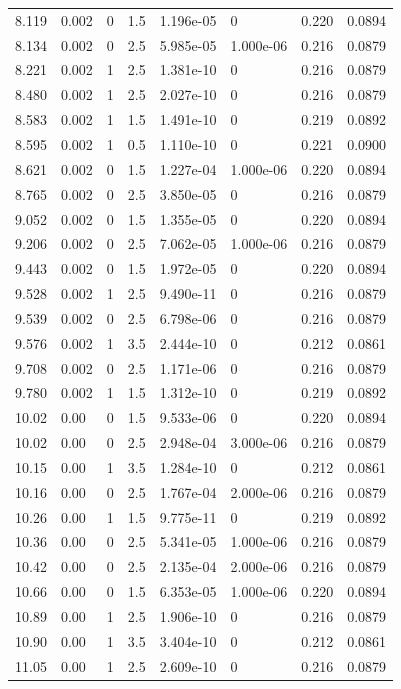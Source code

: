 \documentclass[preview]{standalone}
\begin{document}
{{{\begin{tabular}{L{1.2cm}C{1.2cm} C{0.3cm}C{0.5cm} C{1.4cm}C{1.4cm} C{1.4cm}C{1.4cm}}
  8.119  &  0.002  & 0     & 1.5 &  1.196e-05  & 0  & 0.220 &  0.0894   \\ 
  8.134  &  0.002  & 0     & 2.5 &  5.985e-05  & 1.000e-06  & 0.216 &  0.0879   \\ 
  8.221  &  0.002  & 1     & 2.5 &  1.381e-10  & 0  & 0.216 &  0.0879   \\ 
  8.480  &  0.002  & 1     & 2.5 &  2.027e-10  & 0  & 0.216 &  0.0879   \\ 
  8.583  &  0.002  & 1     & 1.5 &  1.491e-10  & 0  & 0.219 &  0.0892   \\ 
  8.595  &  0.002  & 1     & 0.5 &  1.110e-10  & 0  & 0.221 &  0.0900   \\ 
  8.621  &  0.002  & 0     & 1.5 &  1.227e-04  & 1.000e-06  & 0.220 &  0.0894   \\ 
  8.765  &  0.002  & 0     & 2.5 &  3.850e-05  & 0  & 0.216 &  0.0879   \\ 
  9.052  &  0.002  & 0     & 1.5 &  1.355e-05  & 0  & 0.220 &  0.0894   \\ 
  9.206  &  0.002  & 0     & 2.5 &  7.062e-05  & 1.000e-06  & 0.216 &  0.0879   \\ 
  9.443  &  0.002  & 0     & 1.5 &  1.972e-05  & 0  & 0.220 &  0.0894   \\ 
  9.528  &  0.002  & 1     & 2.5 &  9.490e-11  & 0  & 0.216 &  0.0879   \\ 
  9.539  &  0.002  & 0     & 2.5 &  6.798e-06  & 0  & 0.216 &  0.0879   \\ 
  9.576  &  0.002  & 1     & 3.5 &  2.444e-10  & 0  & 0.212 &  0.0861   \\ 
  9.708  &  0.002  & 0     & 2.5 &  1.171e-06  & 0  & 0.216 &  0.0879   \\ 
  9.780  &  0.002  & 1     & 1.5 &  1.312e-10  & 0  & 0.219 &  0.0892   \\ 
  10.02  &  0.00  & 0     & 1.5 &  9.533e-06  & 0  & 0.220 &  0.0894   \\ 
  10.02  &  0.00  & 0     & 2.5 &  2.948e-04  & 3.000e-06  & 0.216 &  0.0879   \\ 
  10.15  &  0.00  & 1     & 3.5 &  1.284e-10  & 0  & 0.212 &  0.0861   \\ 
  10.16  &  0.00  & 0     & 2.5 &  1.767e-04  & 2.000e-06  & 0.216 &  0.0879   \\ 
  10.26  &  0.00  & 1     & 1.5 &  9.775e-11  & 0  & 0.219 &  0.0892   \\ 
  10.36  &  0.00  & 0     & 2.5 &  5.341e-05  & 1.000e-06  & 0.216 &  0.0879   \\ 
  10.42  &  0.00  & 0     & 2.5 &  2.135e-04  & 2.000e-06  & 0.216 &  0.0879   \\ 
  10.66  &  0.00  & 0     & 1.5 &  6.353e-05  & 1.000e-06  & 0.220 &  0.0894   \\ 
  10.89  &  0.00  & 1     & 2.5 &  1.906e-10  & 0  & 0.216 &  0.0879   \\ 
  10.90  &  0.00  & 1     & 3.5 &  3.404e-10  & 0  & 0.212 &  0.0861   \\ 
  11.05  &  0.00  & 1     & 2.5 &  2.609e-10  & 0  & 0.216 &  0.0879   \\ 
\hline 
\end{tabular} 

}}}
\end{document}
